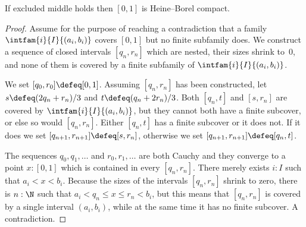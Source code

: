 %
\begin{thm} \label{classical-Heine-Borel}
  If excluded middle holds then $[0,1]$ is Heine--Borel compact.
\end{thm}

\begin{proof}
  Assume for the purpose of reaching a contradiction that a family $\intfam{i}{I}{(a_i,
    b_i)}$ covers $[0,1]$ but no finite subfamily does. We construct a sequence of closed
  intervals $[q_n, r_n]$ which are nested, their sizes shrink to~$0$, and none of them is covered
  by a finite subfamily of $\intfam{i}{I}{(a_i, b_i)}$.

  We set $[q_0, r_0] \defeq [0,1]$. Assuming $[q_n, r_n]$ has been constructed, let $s
  \defeq (2 q_n + r_n)/3$ and $t \defeq (q_n + 2 r_n)/3$. Both $[q_n, t]$ and $[s, r_n]$
  are covered by $\intfam{i}{I}{(a_i, b_i)}$, but they cannot both have a finite subcover,
  or else so would $[q_n, r_n]$. Either $[q_n, t]$ has a finite subcover or it does not.
  If it does we set $[q_{n+1}, r_{n+1}] \defeq [s, r_n]$, otherwise we set $[q_{n+1},
  r_{n+1}] \defeq [q_n, t]$.

  The sequences $q_0, q_1, \ldots$ and $r_0, r_1, \ldots$ are both Cauchy and they
  converge to a point $x : [0,1]$ which is contained in every $[q_n, r_n]$.
  There merely exists $i : I$ such that $a_i < x < b_i$. Because the sizes of the
  intervals $[q_n, r_n]$ shrink to zero, there is $n : \N$ such that $a_i < q_n \leq x
  \leq r_n < b_i$, but this means that $[q_n, r_n]$ is covered by a single interval $(a_i,
  b_i)$, while at the same time it has no finite subcover. A contradiction.
\end{proof}
